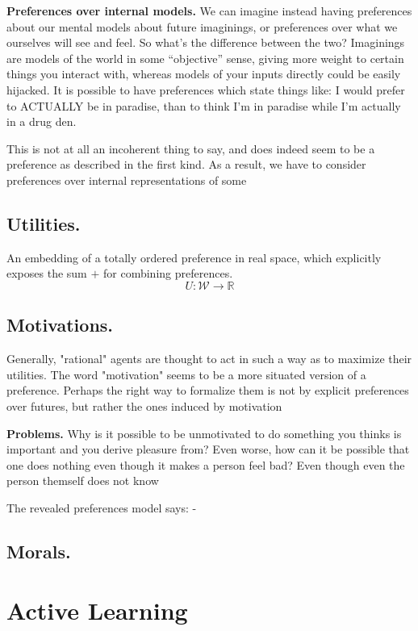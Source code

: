 \documentclass{article}
\begin{document}
	
	\textbf{Preferences over internal models.}
	We can imagine instead having preferences about our mental models about future imaginings, or preferences over what we ourselves will see and feel. So what's the difference between the two? Imaginings are models of the world in some ``objective'' sense, giving more weight to certain things you interact with, whereas models of your inputs directly could be easily hijacked. It is possible to have preferences which state things like: I would prefer to ACTUALLY be in paradise, than to think I'm in paradise while I'm actually in a drug den.  
	
	This is not at all an incoherent thing to say, and does indeed seem to be a preference as described in the first kind. As a result, we have to consider preferences over internal representations of some 
	
	
	\subsection{Utilities.} An embedding of a totally ordered preference in real space, which explicitly exposes the sum $+$ for combining preferences. 
	\[ U: \mathcal W \to \mathbb R \]
	\subsection{Motivations.} Generally, "rational" agents are thought to act in such a way as to maximize their utilities. The word "motivation" seems to be a more situated version of a preference. Perhaps the right way to formalize them is not by explicit preferences over futures, but rather the ones induced by motivation
	
	
	\textbf{Problems.} Why is it possible to be unmotivated to do something you thinks is important and you derive pleasure from?
	Even worse, how can it be possible that one does nothing even though it makes a person feel bad? Even though even the person themself does not know 
	
	The revealed preferences model says:
		- 
	
	\subsection{Morals.}
	
	
	\section{Active Learning}
	
\end{document}
